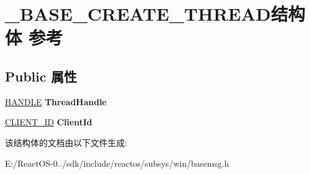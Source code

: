 \hypertarget{struct___b_a_s_e___c_r_e_a_t_e___t_h_r_e_a_d}{}\section{\+\_\+\+B\+A\+S\+E\+\_\+\+C\+R\+E\+A\+T\+E\+\_\+\+T\+H\+R\+E\+A\+D结构体 参考}
\label{struct___b_a_s_e___c_r_e_a_t_e___t_h_r_e_a_d}
\subsection*{Public 属性}
\begin{DoxyCompactItemize}
\item 
\mbox{\label{struct___b_a_s_e___c_r_e_a_t_e___t_h_r_e_a_d_a68ef91606b9b16ff91407eb3dfc856e2}} 
\hyperlink{interfacevoid}{H\+A\+N\+D\+LE} {\bfseries Thread\+Handle}
\item 
\mbox{\label{struct___b_a_s_e___c_r_e_a_t_e___t_h_r_e_a_d_a761da7651d74f0619725060900968cd1}} 
\hyperlink{struct___c_l_i_e_n_t___i_d}{C\+L\+I\+E\+N\+T\+\_\+\+ID} {\bfseries Client\+Id}
\end{DoxyCompactItemize}


该结构体的文档由以下文件生成\+:\begin{DoxyCompactItemize}
\item 
E\+:/\+React\+O\+S-\/0../sdk/include/reactos/subsys/win/basemsg.\+h\end{DoxyCompactItemize}
